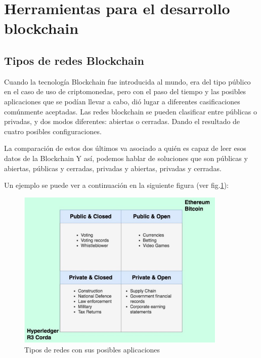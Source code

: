 \section{Herramientas para el desarrollo blockchain}

\subsection{Tipos de redes Blockchain}

Cuando la tecnología Blockchain fue introducida al mundo, era del tipo público en el caso de uso de criptomonedas, pero
con el paso del tiempo y las posibles aplicaciones que se podían llevar a cabo, dió lugar a diferentes casificaciones 
comúnmente aceptadas. Las redes blockchain se pueden clasificar entre públicas o privadas, y dos modos diferentes: 
abiertas o cerradas. Dando el resultado de cuatro posibles configuraciones.

\vspace{5mm}

\noindent La comparación de estos dos últimos va asociado a quién es capaz de leer esos datos de la Blockchain Y así, 
podemos hablar de soluciones que son públicas y abiertas, públicas y cerradas, privadas y abiertas, privadas y 
cerradas.

\vspace{5mm}

\noindent Un ejemplo se puede ver a continuación en la siguiente figura (ver fig.\ref{fig:tipos-de-redes}):

\vspace{5mm}

\begin{figure}[ht!]
    \centering
    \includegraphics[width=10cm]{imagenes/herramientas/tipos_de_redes}
    \caption{Tipos de redes con sus posibles aplicaciones}
    \label{fig:tipos-de-redes}
\end{figure}

